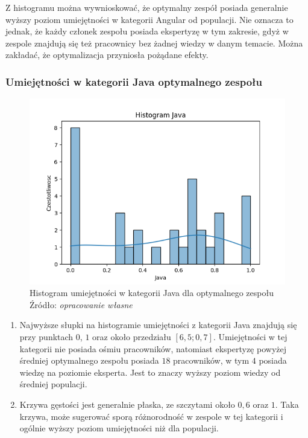         \par Z histogramu można wywnioskować, że optymalny zespół posiada generalnie wyższy poziom umiejętności w kategorii Angular od populacji. Nie oznacza to jednak, że każdy członek zespołu posiada ekspertyzę w tym zakresie, gdyż w zespole znajdują się też pracownicy bez żadnej wiedzy w danym temacie. Można zakładać, że optymalizacja przyniosła pożądane efekty.
        
        \subsubsection{Umiejętności w kategorii Java optymalnego zespołu}
        \begin{figure}[H]
            \centering
            \includegraphics[width=\linewidth]{chapters/Images/hist_java_optimal.png}
            \cprotect\caption{Histogram umiejętności w kategorii Java dla optymalnego zespołu\\ Źródło:\textit{ opracowanie własne}}
            \label{fig:hist_java_optimal}
        \end{figure}

        \begin{enumerate}
            \item Najwyższe słupki na histogramie umiejętności z kategorii Java znajdują się przy punktach $0$, $1$ oraz około przedziału $[6,5; 0,7]$. Umiejętności w tej kategorii nie posiada ośmiu pracowników, natomiast ekspertyzę powyżej średniej optymalnego zespołu posiada $18$ pracowników, w tym $4$ posiada wiedzę na poziomie eksperta. Jest to znaczy wyższy poziom wiedzy od średniej populacji.
            \item Krzywa gęstości jest generalnie płaska, ze szczytami około $0,6$ oraz $1$. Taka krzywa, może sugerować sporą różnorodność w zespole w tej kategorii i ogólnie wyższy poziom umiejętności niż dla populacji.
        \end{enumerate}


